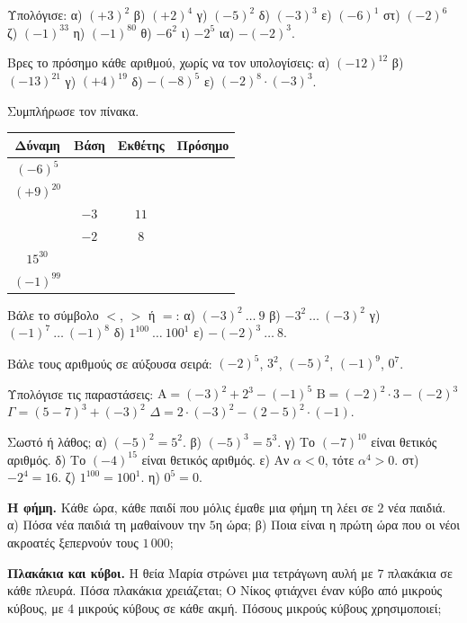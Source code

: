 \ex Υπολόγισε: α) $(+3)^2$ \quad β) $(+2)^4$ \quad γ) $(-5)^2$ \quad δ) $(-3)^3$ \quad ε) $(-6)^1$ \quad στ) $(-2)^6$ \quad ζ) $(-1)^{33}$ \quad η) $(-1)^{80}$ \quad θ) $-6^2$ \quad ι) $-2^5$ \quad ια) $-(-2)^3$.

\ex Βρες το πρόσημο κάθε αριθμού, χωρίς να τον υπολογίσεις: α) $(-12)^{12}$ \quad β) $(-13)^{21}$ \quad γ) $(+4)^{19}$ \quad δ) $-(-8)^5$ \quad ε) $(-2)^8\cdot(-3)^3$.

\ex Συμπλήρωσε τον πίνακα.
\begin{center}
\renewcommand{\arraystretch}{1.4}
\begin{tabular}{|c|c|c|c|}\hline
Δύναμη & Βάση & Εκθέτης & Πρόσημο\\\hline
$(-6)^5$ & & &\\\hline
$(+9)^{20}$ & & &\\\hline
 & $-3$ & $11$ &\\\hline
 & $-2$ & $8$ &\\\hline
$15^{30}$ & & &\\\hline
$(-1)^{99}$ & & &\\\hline
\end{tabular}
\end{center}

\ex Βάλε το σύμβολο $<$, $>$ ή $=$: α) $(-3)^2\ \ldots\ 9$ \quad β) $-3^2\ \ldots\ (-3)^2$ \quad γ) $(-1)^7\ \ldots\ (-1)^8$ \quad δ) $1^{100}\ \ldots\ 100^1$ \quad ε) $-(-2)^3\ \ldots\ 8$.

\ex Βάλε τους αριθμούς σε αύξουσα σειρά: $(-2)^5$, $3^2$, $(-5)^2$, $(-1)^9$, $0^7$.

\ex Υπολόγισε τις παραστάσεις: $\mathrm{Α}=(-3)^2+2^3-(-1)^5$ \quad $\mathrm{Β}=(-2)^2\cdot3-(-2)^3$ \quad $\Gamma=(5-7)^3+(-3)^2$ \quad $\Delta=2\cdot(-3)^2-(2-5)^2\cdot(-1)$.

\ex Σωστό ή λάθος; α) $(-5)^2=5^2$. \quad β) $(-5)^3=5^3$. \quad γ) Το $(-7)^{10}$ είναι θετικός αριθμός. \quad δ) Το $(-4)^{15}$ είναι θετικός αριθμός. \quad ε) Αν $\alpha<0$, τότε $\alpha^4>0$. \quad στ) $-2^4=16$. \quad ζ) $1^{100}=100^1$. \quad η) $0^5=0$.


\ex \textbf{Η φήμη.} Κάθε ώρα, κάθε παιδί που μόλις έμαθε μια φήμη τη λέει σε $2$ νέα παιδιά. α) Πόσα νέα παιδιά τη μαθαίνουν την $5$η ώρα; β) Ποια είναι η πρώτη ώρα που οι νέοι ακροατές ξεπερνούν τους $1\,000$;

\ex \textbf{Πλακάκια και κύβοι.} Η θεία Μαρία στρώνει μια τετράγωνη αυλή με $7$ πλακάκια σε κάθε πλευρά. Πόσα πλακάκια χρειάζεται; Ο Νίκος φτιάχνει έναν κύβο από μικρούς κύβους, με $4$ μικρούς κύβους σε κάθε ακμή. Πόσους μικρούς κύβους χρησιμοποιεί;

